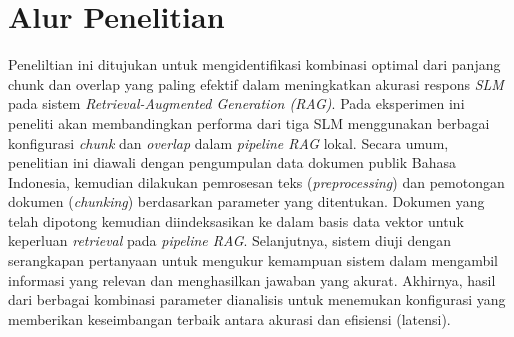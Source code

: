 \section{Alur Penelitian}
Peneliltian ini ditujukan untuk mengidentifikasi kombinasi optimal dari panjang chunk dan overlap yang paling efektif dalam meningkatkan akurasi respons \textit{SLM} pada sistem \textit{Retrieval-Augmented Generation (RAG)}. Pada eksperimen ini peneliti akan membandingkan performa dari tiga SLM menggunakan berbagai konfigurasi \textit{chunk} dan \textit{overlap} dalam \textit{pipeline RAG} lokal.
Secara umum, penelitian ini diawali dengan pengumpulan data dokumen publik Bahasa Indonesia, kemudian dilakukan pemrosesan teks (\textit{preprocessing}) dan pemotongan dokumen (\textit{chunking}) berdasarkan parameter yang ditentukan. Dokumen yang telah dipotong kemudian diindeksasikan ke dalam basis data vektor untuk keperluan \textit{retrieval} pada \textit{pipeline RAG}. Selanjutnya, sistem diuji dengan serangkapan pertanyaan untuk mengukur kemampuan sistem dalam mengambil informasi yang relevan dan menghasilkan jawaban yang akurat. Akhirnya, hasil dari berbagai kombinasi parameter dianalisis untuk menemukan konfigurasi yang memberikan keseimbangan terbaik antara akurasi dan efisiensi (latensi).

